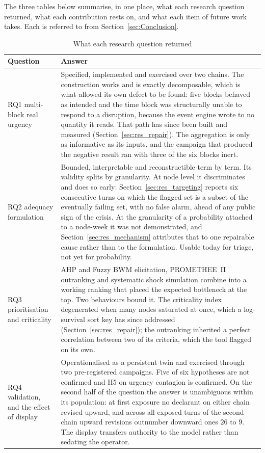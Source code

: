 The three tables below summarise, in one place, what each research question returned,
what each contribution rests on, and what each item of future work takes. Each is
referred to from Section~\ref{sec:Conclusion}.

\begin{table}[htbp]
\centering
\caption{What each research question returned}
\label{tab:rq_answers}
\small
\begin{tabularx}{\linewidth}{>{\raggedright\arraybackslash}p{2.0cm} X}
\toprule
\textbf{Question} & \textbf{Answer} \\
\midrule
RQ1 \newline multi-block real urgency & Specified, implemented and exercised over two chains.
The construction works and is exactly decomposable, which is what allowed its own defect to
be found: five blocks behaved as intended and the time block was structurally unable to
respond to a disruption, because the event engine wrote to no quantity it reads. That path
has since been built and measured (Section~\ref{sec:res_repair}). The aggregation is only as
informative as its inputs, and the campaign that produced the negative result ran with three
of the six blocks inert. \\[3pt]
\midrule
RQ2 \newline adequacy formulation & Bounded, interpretable and reconstructible term by term.
Its validity splits by granularity. At node level it discriminates and does so early:
Section~\ref{sec:res_targeting} reports six consecutive turns on which the flagged set is a
subset of the eventually failing set, with no false alarm, ahead of any public sign of the
crisis. At the granularity of a probability attached to a node-week it was not demonstrated,
and Section~\ref{sec:res_mechanism} attributes that to one repairable cause rather than to the
formulation. Usable today for triage, not yet for probability. \\[3pt]
\midrule
RQ3 \newline prioritisation and criticality & AHP and Fuzzy BWM elicitation, PROMETHEE~II
outranking and systematic shock simulation combine into a working ranking that placed the
expected bottleneck at the top. Two behaviours bound it. The criticality index degenerated
when many nodes saturated at once, which a log-survival sort key has since addressed
(Section~\ref{sec:res_repair}); the outranking inherited a perfect correlation between two of
its criteria, which the tool flagged on its own. \\[3pt]
\midrule
RQ4 \newline validation, and the effect of display & Operationalised as a persistent twin and
exercised through two pre-registered campaigns. Five of six hypotheses are not confirmed and
H5 on urgency contagion is confirmed. On the second half of the question the answer is
unambiguous within its population: at first exposure no declarant on either chain revised
upward, and across all exposed turns of the second chain upward revisions outnumber downward
ones $26$ to $9$. The display transfers authority to the model rather than sedating the
operator. \\
\bottomrule
\end{tabularx}
\end{table}

